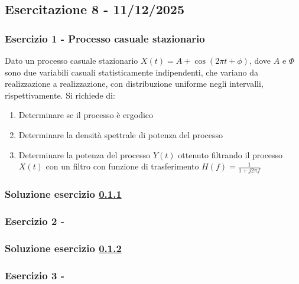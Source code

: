 \documentclass[../main.tex]{subfiles}
\begin{document}
\clearpage
\thispagestyle{empty}
\vspace*{7cm}
\subsection{Esercitazione 8 - 11/12/2025}
\vspace*{1.5cm}

\vspace*{1.5cm}
\subsubsection{Esercizio 1 - Processo casuale stazionario}
\label{ss81}

Dato un processo casuale stazionario $X(t) = A + \cos(2 \pi t + \phi)$, dove $A$ e $\Phi$ sono due variabili casuali statisticamente indipendenti, che variano da realizzazione a realizzazione, con distribuzione uniforme negli intervalli, rispettivamente.
Si richiede di:

\begin{enumerate}
	\item Determinare se il processo è ergodico
	\item Determinare la densità spettrale di potenza del processo
	\item Determinare la potenza del processo $Y(t)$ ottenuto filtrando il processo $X(t)$ con un filtro con funzione di trasferimento $H(f) = \frac{1}{1+j 2\pi f}$

\end{enumerate}

\subsubsection*{Soluzione esercizio \ref{ss81}}

\vspace*{1.5cm}
\subsubsection{Esercizio 2 - }
\label{ss82}

\subsubsection*{Soluzione esercizio \ref{ss82}}

\vspace*{1.5cm}
\subsubsection{Esercizio 3 - }
\label{ss83}
\end{document}
